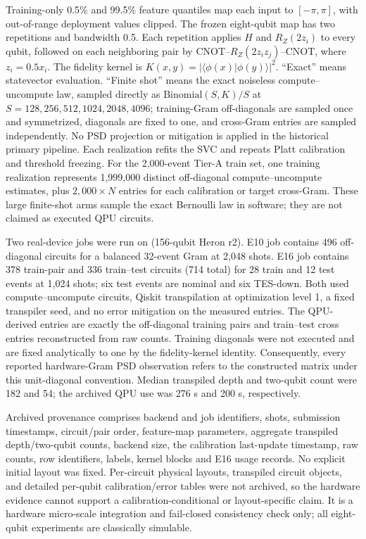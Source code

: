 \documentclass[11pt,a4paper]{article}
\begin{document}
Training-only 0.5\% and 99.5\% feature quantiles map each input to
$[-\pi,\pi]$, with out-of-range deployment values clipped. The frozen
eight-qubit map has two repetitions and bandwidth 0.5. Each repetition applies
$H$ and $R_Z(2z_i)$ to every qubit, followed on each neighboring pair by
CNOT--$R_Z(2z_i z_j)$--CNOT, where $z_i=0.5x_i$. The fidelity kernel is
$K(x,y)=\lvert\langle\phi(x)\vert\phi(y)\rangle\rvert^2$. ``Exact'' means
statevector evaluation. ``Finite shot'' means the exact noiseless
compute--uncompute law, sampled directly as
$\mathrm{Binomial}(S,K)/S$ at $S=128,256,512,1024,2048,4096$; training-Gram
off-diagonals are sampled once and symmetrized, diagonals are fixed to one,
and cross-Gram entries are sampled independently. No PSD projection or
mitigation is applied in the historical primary pipeline. Each realization
refits the SVC and repeats Platt
calibration and threshold freezing. For the 2,000-event Tier-A train set, one
training realization represents 1,999,000 distinct off-diagonal
compute--uncompute estimates, plus $2,000\times N$ entries for each calibration
or target cross-Gram. These large finite-shot arms sample the exact Bernoulli
law in software; they are not claimed as executed QPU circuits.

Two real-device jobs were run on  (156-qubit Heron r2).
E10 job  contains 496 off-diagonal circuits for a
balanced 32-event Gram at 2,048 shots. E16 job
 contains 378 train-pair and 336 train--test
circuits (714 total) for 28 train and 12 test events at 1,024 shots; six test
events are nominal and six TES-down. Both used compute--uncompute circuits,
Qiskit transpilation at optimization level 1, a fixed transpiler seed, and no
error mitigation on the measured entries. The QPU-derived entries are exactly
the off-diagonal training pairs and train--test cross entries reconstructed
from raw counts. Training diagonals were not executed and are fixed
analytically to one by the fidelity-kernel identity. Consequently, every
reported hardware-Gram PSD observation refers to the constructed matrix under
this unit-diagonal convention. Median transpiled depth and two-qubit count were 182 and 54;
the archived QPU use was 276 s and 200 s, respectively.

Archived provenance comprises backend and job identifiers, shots, submission
timestamps, circuit/pair order, feature-map parameters, aggregate transpiled
depth/two-qubit counts, backend size, the calibration last-update timestamp,
raw counts, row identifiers, labels, kernel blocks and E16 usage records. No
explicit initial layout was fixed. Per-circuit physical layouts, transpiled
circuit objects, and detailed per-qubit calibration/error tables were not
archived, so the hardware evidence cannot support a calibration-conditional or
layout-specific claim. It is a hardware micro-scale integration and
fail-closed consistency check only; all eight-qubit experiments are
classically simulable.
\end{document}
